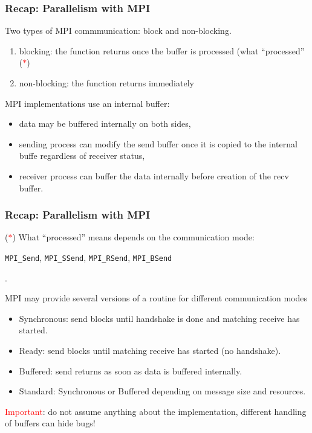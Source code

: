 \begin{frame}
  \frametitle{Recap: Parallelism with MPI}

Two types of MPI commmunication: block and non-blocking.
\begin{center}
    \scalebox{0.8}{}
\end{center}
\begin{enumerate}
\item blocking: the function returns once the buffer is processed (what ``processed'' (\textcolor{red}{$\ast$})
\item non-blocking: the function returns immediately
\end{enumerate}

\bigskip
MPI implementations use an internal buffer:
\begin{itemize}
\item data may be buffered internally on both sides,
\item sending process can modify the send buffer once it is copied to the internal buffe regardless of receiver status,
\item receiver process can buffer the data internally before creation of the recv buffer.
\end{itemize}

\end{frame}

\begin{frame}
  \frametitle{Recap: Parallelism with MPI}

(\textcolor{red}{$\ast$}) What ``processed'' means depends on the communication mode:
\begin{center}
\texttt{MPI\_Send}, \texttt{MPI\_SSend}, \texttt{MPI\_RSend}, \texttt{MPI\_BSend}
\end{center}.

\bigskip
MPI may provide several versions of a routine for different communication modes
\begin{itemize}
\item Synchronous: send blocks until handshake is done and matching receive has started.
\item Ready: send blocks until matching receive has started (no handshake).
\item Buffered: send returns as soon as data is buffered internally.
\item Standard: Synchronous or Buffered depending on message size and resources.
\end{itemize}

\textcolor{red}{Important}: do not assume anything about the implementation, different handling of buffers can hide bugs!
\end{frame}

